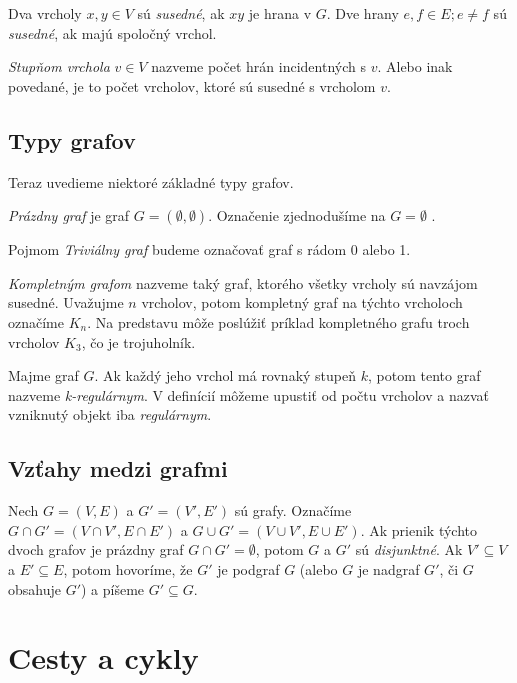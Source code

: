 Dva vrcholy $x, y \in V$ sú  \textit{susedné}, ak $xy$ je hrana v $G$.
Dve hrany $e, f \in E; e \neq f$ sú  \textit{susedné}, ak majú spoločný vrchol.\newline

\textit{Stupňom vrchola} $v \in V$ nazveme počet hrán incidentných s $v$. Alebo inak povedané, je to počet vrcholov, ktoré sú susedné s vrcholom $v$.


\subsection{Typy grafov}

Teraz uvedieme niektoré základné typy grafov.\newline

\textit{Prázdny graf} je graf $G = (\emptyset, \emptyset)$. Označenie zjednodušíme na $G = \emptyset$ .\newline

Pojmom \textit{Triviálny graf} budeme označovať graf s rádom 0 alebo 1.\newline

\textit{Kompletným grafom} nazveme taký graf, ktorého všetky vrcholy sú navzájom susedné. Uvažujme $n$ vrcholov, potom kompletný graf na týchto vrcholoch označíme $K_{n}$. Na predstavu môže poslúžiť príklad kompletného grafu troch vrcholov $K_{3}$, čo je trojuholník.\newline

Majme graf $G$. Ak každý jeho vrchol má rovnaký stupeň $k$, potom tento graf nazveme \textit{k-regulárnym}. V definícií môžeme upustiť od počtu vrcholov a nazvať vzniknutý objekt iba \textit{regulárnym}.\newline


\subsection{Vzťahy medzi grafmi}

Nech $G = (V, E)$ a $G' = (V', E')$ sú grafy. Označíme $G\cap G' = (V\cap V', E\cap E')$ a $G\cup G' = (V\cup V', E\cup E')$. Ak prienik týchto dvoch grafov je prázdny graf $G\cap G' = \emptyset$, potom $G$ a $G'$ sú \textit{disjunktné}. Ak $V'\subseteq V$ a $E'\subseteq E$, potom hovoríme, že $G'$ je podgraf $G$ (alebo $G$ je nadgraf $G'$, či $G$ obsahuje $G'$) a píšeme $G'\subseteq G$.\newline


\section{Cesty a cykly}


